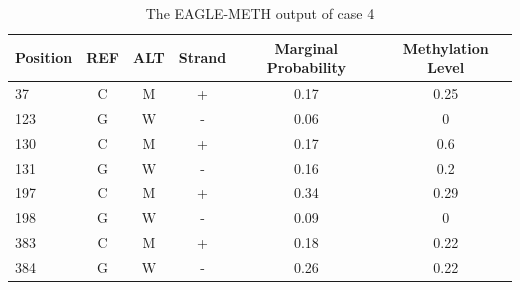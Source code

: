 \documentclass{PHlab-thesis}
\begin{document}
\vspace{15mm}
\begin{table}[h!]
	\centering
	\begin{tabular}{l*{5}{c}}
		Position    & REF & ALT & Strand & Marginal Probability & Methylation Level\\
		\hline
		37  & C & M & + & 0.17 & 0.25  \\
		123 & G & W & - & 0.06 & 0  \\
		130 & C & M & + & 0.17 & 0.6  \\
		131 & G & W & - & 0.16 & 0.2 \\
		197 & C & M & + & 0.34 & 0.29 \\
    198 & G & W & - & 0.09 & 0  \\
		383 & C & M & + & 0.18 & 0.22  \\
    384 & G & W & - & 0.26 & 0.22  \\
	\end{tabular}
	\caption{The EAGLE-METH output of case 4}
	\label{case4}
\end{table}
\end{document}

